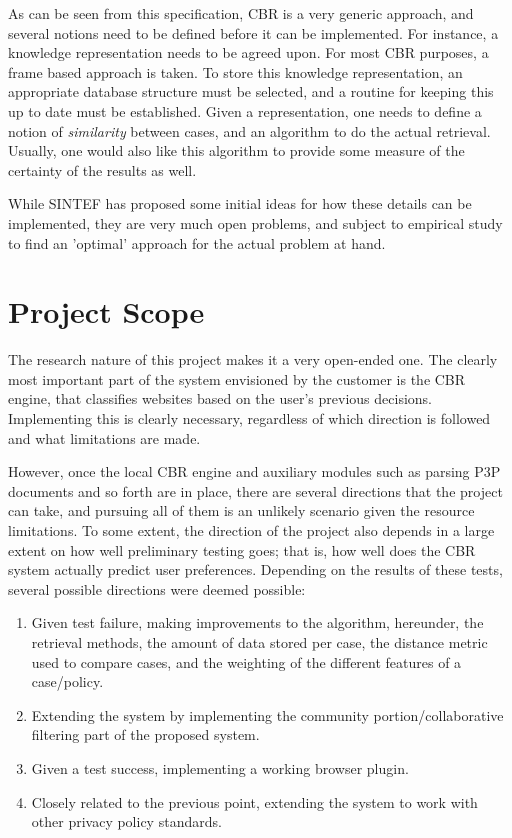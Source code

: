As can be seen from this specification, CBR is a very generic approach, and several notions need to be defined before it can be implemented. For instance, a knowledge representation needs to be agreed upon. For most CBR purposes, a frame based approach is taken. To store this knowledge representation, an appropriate database structure must be selected, and a routine for keeping this up to date must be established. Given a representation, one needs to define a notion of \emph{similarity} between cases, and an algorithm to do the actual retrieval. Usually, one would also like this algorithm to provide some measure of the certainty of the results as well.

While SINTEF has proposed some initial ideas for how these details can be implemented, they are very much open problems, and subject to empirical study to find an 'optimal' approach for the actual problem at hand.

\section{Project Scope}
The research nature of this project makes it a very open-ended one. The clearly most important part of the system envisioned by the customer is the CBR engine, that classifies websites based on the user's previous decisions. Implementing this is clearly necessary, regardless of which direction is followed and what limitations are made.

However, once the local CBR engine and auxiliary modules such as parsing P3P documents and so forth are in place, there are several directions that the project can take, and pursuing all of them is an unlikely scenario given the resource limitations. To some extent, the direction of the project also depends in a large extent on how well preliminary testing goes; that is, how well does the CBR system actually predict user preferences. Depending on the results of these tests, several possible directions were deemed possible:

\begin{enumerate}
\item Given test failure, making improvements to the algorithm, hereunder, the retrieval methods, the amount of data stored per case, the distance metric used to compare cases, and the weighting of the different features of a case/policy.
\item Extending the system by implementing the community portion/collaborative filtering part of the proposed system.
\item Given a test success, implementing a working browser plugin.
\item Closely related to the previous point, extending the system to work with other privacy policy standards.
\end{enumerate}

